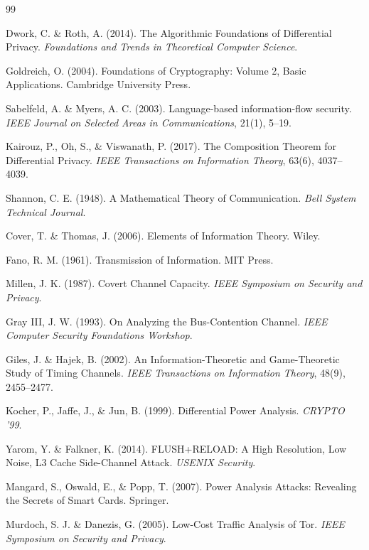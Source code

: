 \documentclass[11pt,a4paper]{article}
\theoremstyle{definition}
\begin{document}
\begin{thebibliography}{99}

Dwork, C. \& Roth, A. (2014). The Algorithmic Foundations of Differential Privacy. \textit{Foundations and Trends in Theoretical Computer Science}.

Goldreich, O. (2004). Foundations of Cryptography: Volume 2, Basic Applications. Cambridge University Press.

Sabelfeld, A. \& Myers, A. C. (2003). Language-based information-flow security. \textit{IEEE Journal on Selected Areas in Communications}, 21(1), 5--19.

Kairouz, P., Oh, S., \& Viswanath, P. (2017). The Composition Theorem for Differential Privacy. \textit{IEEE Transactions on Information Theory}, 63(6), 4037--4039.

Shannon, C. E. (1948). A Mathematical Theory of Communication. \textit{Bell System Technical Journal}.

Cover, T. \& Thomas, J. (2006). Elements of Information Theory. Wiley.

Fano, R. M. (1961). Transmission of Information. MIT Press.

Millen, J. K. (1987). Covert Channel Capacity. \textit{IEEE Symposium on Security and Privacy}.

Gray III, J. W. (1993). On Analyzing the Bus-Contention Channel. \textit{IEEE Computer Security Foundations Workshop}.

Giles, J. \& Hajek, B. (2002). An Information-Theoretic and Game-Theoretic Study of Timing Channels. \textit{IEEE Transactions on Information Theory}, 48(9), 2455--2477.

Kocher, P., Jaffe, J., \& Jun, B. (1999). Differential Power Analysis. \textit{CRYPTO '99}.

Yarom, Y. \& Falkner, K. (2014). FLUSH+RELOAD: A High Resolution, Low Noise, L3 Cache Side-Channel Attack. \textit{USENIX Security}.

Mangard, S., Oswald, E., \& Popp, T. (2007). Power Analysis Attacks: Revealing the Secrets of Smart Cards. Springer.

Murdoch, S. J. \& Danezis, G. (2005). Low-Cost Traffic Analysis of Tor. \textit{IEEE Symposium on Security and Privacy}.


\end{thebibliography}
\end{document}
